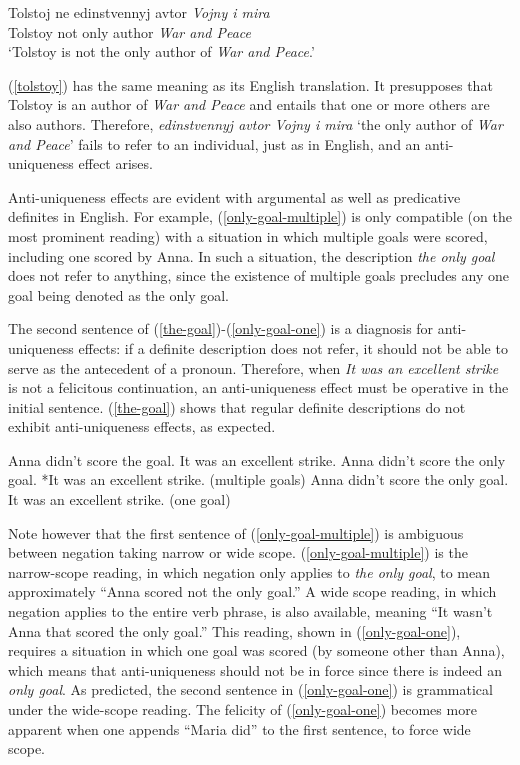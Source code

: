 \documentclass{article}
\begin{document}
\begin{exe}
	\ex \label{tolstoy} \gll Tolstoj ne edinstvennyj avtor \textit{Vojny i mira}\\
	Tolstoy not only author \textit{War and Peace}\\
	\glt `Tolstoy is not the only author of \textit{War and Peace}.'
\end{exe}

(\ref{tolstoy}) has the same meaning as its English translation. It presupposes that Tolstoy is an author of \textit{War and Peace} and entails that one or more others are also authors. Therefore, \textit{edinstvennyj avtor Vojny i mira} `the only author of \textit{War and Peace}' fails to refer to an individual, just as in English, and an anti-uniqueness effect arises.

Anti-uniqueness effects are evident with argumental as well as predicative definites in English. For example, (\ref{only-goal-multiple}) is only compatible (on the most prominent reading) with a situation in which multiple goals were scored, including one scored by Anna. In such a situation, the description \textit{the only goal} does not refer to anything, since the existence of multiple goals precludes any one goal being denoted as the only goal.

The second sentence of (\ref{the-goal})-(\ref{only-goal-one}) is a diagnosis for anti-uniqueness effects: if a definite description does not refer, it should not be able to serve as the antecedent of a pronoun. Therefore, when \textit{It was an excellent strike} is not a felicitous continuation, an anti-uniqueness effect must be operative in the initial sentence. (\ref{the-goal}) shows that regular definite descriptions do not exhibit anti-uniqueness effects, as expected.

\begin{exe}
	\ex \label{the-goal} Anna didn't score the goal. It was an excellent strike.
	\ex \label{only-goal-multiple} Anna didn't score the only goal. *It was an excellent strike. (multiple goals)
	\ex \label{only-goal-one} Anna didn't score the only goal. It was an excellent strike. (one goal)
\end{exe}

Note however that the first sentence of (\ref{only-goal-multiple}) is ambiguous between negation taking narrow or wide scope. (\ref{only-goal-multiple}) is the narrow-scope reading, in which negation only applies to \textit{the only goal}, to mean approximately ``Anna scored not the only goal.'' A wide scope reading, in which negation applies to the entire verb phrase, is also available, meaning ``It wasn't Anna that scored the only goal.'' This reading, shown in (\ref{only-goal-one}), requires a situation in which one goal was scored (by someone other than Anna), which means that anti-uniqueness should not be in force since there is indeed an \textit{only goal}. As predicted, the second sentence in (\ref{only-goal-one}) is grammatical under the wide-scope reading. The felicity of (\ref{only-goal-one}) becomes more apparent when one appends ``Maria did'' to the first sentence, to force wide scope.
\end{document}

